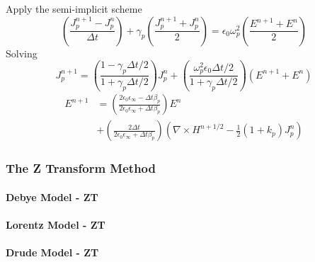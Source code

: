 Apply the semi-implicit scheme
\begin{equation}
  \left(\frac{J_p^{n+1} - J_p^n}{\Delta t}\right) + \gamma_{p}\left(\frac{J_p^{n+1} + J_p^n}{2}\right) = \epsilon_0\omega_p^2\left(\frac{E^{n+1} + E^n}{2}\right)
\end{equation}
Solving
\begin{equation}
  J_p^{n+1} = \left(\frac{1-\gamma_p\Delta t /2}{1+\gamma_p\Delta t /2}\right)J_p^n + \left(\frac{\omega_p^2\epsilon_0\Delta t /2}{1+\gamma_p\Delta t /2}\right)\left(E^{n+1}+E^n\right)
\end{equation}
\begin{equation}
  \begin{split}
    E^{n+1} & = \left(\frac{2\epsilon_0\epsilon_{\infty} - \Delta t \beta_p}{2\epsilon_0\epsilon_{\infty} + \Delta t \beta_p}\right)E^n \\
    & + \left(\frac{2\Delta t}{2\epsilon_0\epsilon_{\infty} + \Delta t \beta_p}\right)\left(\nabla\times H^{n+1/2} - \frac{1}{2}(1+k_p)J_p^n\right)
  \end{split}
\end{equation}



\subsubsection{The Z Transform Method}
\paragraph{Debye Model - ZT}

\paragraph{Lorentz Model - ZT}

\paragraph{Drude Model - ZT}
